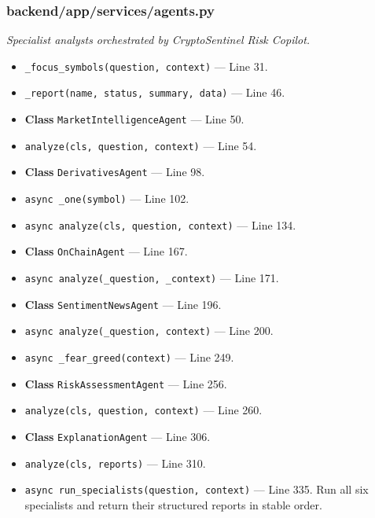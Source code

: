 \subsubsection*{backend/app/services/agents.py}
\textit{Specialist analysts orchestrated by CryptoSentinel Risk Copilot.}
\begin{itemize}[nosep,leftmargin=1.5em]
\item \texttt{\_\allowbreak{}focus\_\allowbreak{}symbols(\allowbreak{}question,\allowbreak{} context)} --- Line 31.
\item \texttt{\_\allowbreak{}report(\allowbreak{}name,\allowbreak{} status,\allowbreak{} summary,\allowbreak{} data)} --- Line 46.
\item \textbf{Class} \texttt{MarketIntelligenceAgent} --- Line 50.
\item \hspace*{1em}\texttt{analyze(\allowbreak{}cls,\allowbreak{} question,\allowbreak{} context)} --- Line 54.
\item \textbf{Class} \texttt{DerivativesAgent} --- Line 98.
\item \hspace*{1em}\texttt{async \_\allowbreak{}one(\allowbreak{}symbol)} --- Line 102.
\item \hspace*{1em}\texttt{async analyze(\allowbreak{}cls,\allowbreak{} question,\allowbreak{} context)} --- Line 134.
\item \textbf{Class} \texttt{OnChainAgent} --- Line 167.
\item \hspace*{1em}\texttt{async analyze(\allowbreak{}\_\allowbreak{}question,\allowbreak{} \_\allowbreak{}context)} --- Line 171.
\item \textbf{Class} \texttt{SentimentNewsAgent} --- Line 196.
\item \hspace*{1em}\texttt{async analyze(\allowbreak{}\_\allowbreak{}question,\allowbreak{} context)} --- Line 200.
\item \texttt{async \_\allowbreak{}fear\_\allowbreak{}greed(\allowbreak{}context)} --- Line 249.
\item \textbf{Class} \texttt{RiskAssessmentAgent} --- Line 256.
\item \hspace*{1em}\texttt{analyze(\allowbreak{}cls,\allowbreak{} question,\allowbreak{} context)} --- Line 260.
\item \textbf{Class} \texttt{ExplanationAgent} --- Line 306.
\item \hspace*{1em}\texttt{analyze(\allowbreak{}cls,\allowbreak{} reports)} --- Line 310.
\item \texttt{async run\_\allowbreak{}specialists(\allowbreak{}question,\allowbreak{} context)} --- Line 335. Run all six specialists and return their structured reports in stable order.
\end{itemize}
